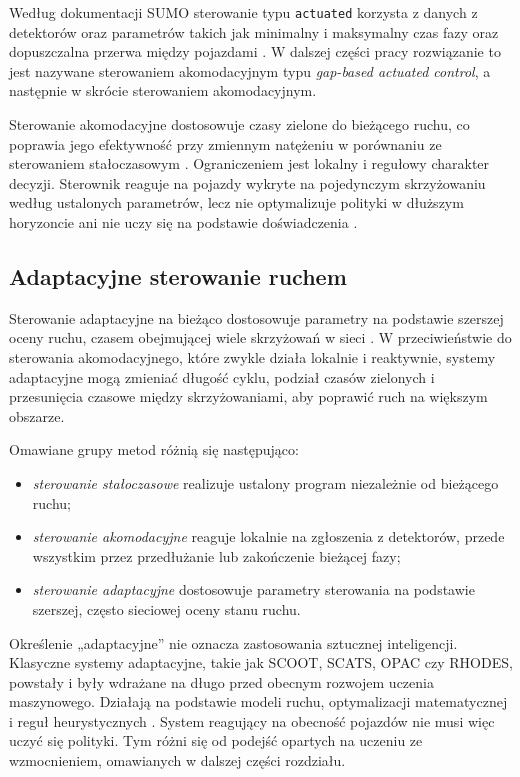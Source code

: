 Według dokumentacji SUMO sterowanie typu \texttt{actuated} korzysta z danych z detektorów oraz parametrów takich jak minimalny i maksymalny czas fazy oraz dopuszczalna przerwa między pojazdami \cite{sumoTrafficLights}. W dalszej części pracy rozwiązanie to jest nazywane sterowaniem akomodacyjnym typu \textit{gap-based actuated control}, a następnie w skrócie sterowaniem akomodacyjnym.

Sterowanie akomodacyjne dostosowuje czasy zielone do bieżącego ruchu, co poprawia jego efektywność przy zmiennym natężeniu w porównaniu ze sterowaniem stałoczasowym \cite{wei2019survey}. Ograniczeniem jest lokalny i regułowy charakter decyzji. Sterownik reaguje na pojazdy wykryte na pojedynczym skrzyżowaniu według ustalonych parametrów, lecz nie optymalizuje polityki w dłuższym horyzoncie ani nie uczy się na podstawie doświadczenia \cite{wei2019survey}.

\subsection{Adaptacyjne sterowanie ruchem}
\label{subsec:adaptacyjne}

Sterowanie adaptacyjne na bieżąco dostosowuje parametry na podstawie szerszej oceny ruchu, czasem obejmującej wiele skrzyżowań w sieci \cite{wei2019survey}. W przeciwieństwie do sterowania akomodacyjnego, które zwykle działa lokalnie i reaktywnie, systemy adaptacyjne mogą zmieniać długość cyklu, podział czasów zielonych i przesunięcia czasowe między skrzyżowaniami, aby poprawić ruch na większym obszarze.

Omawiane grupy metod różnią się następująco:
\begin{itemize}
    \item \emph{sterowanie stałoczasowe} realizuje ustalony program niezależnie od bieżącego ruchu;
    \item \emph{sterowanie akomodacyjne} reaguje lokalnie na zgłoszenia z detektorów, przede wszystkim przez przedłużanie lub zakończenie bieżącej fazy;
    \item \emph{sterowanie adaptacyjne} dostosowuje parametry sterowania na podstawie szerszej, często sieciowej oceny stanu ruchu.
\end{itemize}

Określenie „adaptacyjne'' nie oznacza zastosowania sztucznej inteligencji. Klasyczne systemy adaptacyjne, takie jak SCOOT, SCATS, OPAC czy RHODES, powstały i były wdrażane na długo przed obecnym rozwojem uczenia maszynowego. Działają na podstawie modeli ruchu, optymalizacji matematycznej i reguł heurystycznych \cite{wei2019survey}. System reagujący na obecność pojazdów nie musi więc uczyć się polityki. Tym różni się od podejść opartych na uczeniu ze wzmocnieniem, omawianych w dalszej części rozdziału.

